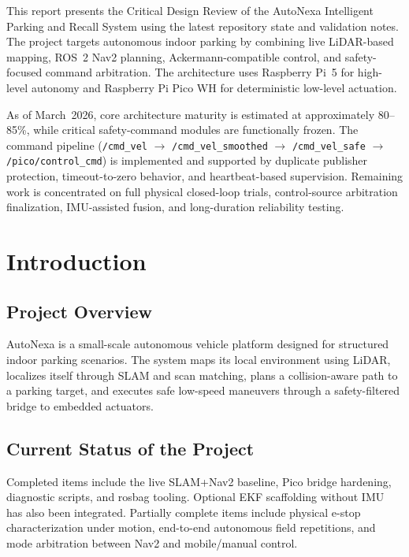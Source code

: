 \documentclass[12pt,a4paper]{report}
\newcommand{\projectname}{AutoNexa}
\begin{document}
This report presents the Critical Design Review of the \projectname{} Intelligent Parking and Recall System using the latest repository state and validation notes. The project targets autonomous indoor parking by combining live LiDAR-based mapping, ROS~2 Nav2 planning, Ackermann-compatible control, and safety-focused command arbitration. The architecture uses Raspberry Pi~5 for high-level autonomy and Raspberry Pi Pico WH for deterministic low-level actuation.

As of March~2026, core architecture maturity is estimated at approximately 80--85\%, while critical safety-command modules are functionally frozen. The command pipeline (\texttt{/cmd\_vel} $\rightarrow$ \texttt{/cmd\_vel\_smoothed} $\rightarrow$ \texttt{/cmd\_vel\_safe} $\rightarrow$ \texttt{/pico/control\_cmd}) is implemented and supported by duplicate publisher protection, timeout-to-zero behavior, and heartbeat-based supervision. Remaining work is concentrated on full physical closed-loop trials, control-source arbitration finalization, IMU-assisted fusion, and long-duration reliability testing.

\chapter{Introduction}

\section{Project Overview}
\projectname{} is a small-scale autonomous vehicle platform designed for structured indoor parking scenarios. The system maps its local environment using LiDAR, localizes itself through SLAM and scan matching, plans a collision-aware path to a parking target, and executes safe low-speed maneuvers through a safety-filtered bridge to embedded actuators.

\section{Current Status of the Project}
Completed items include the live SLAM+Nav2 baseline, Pico bridge hardening, diagnostic scripts, and rosbag tooling. Optional EKF scaffolding without IMU has also been integrated. Partially complete items include physical e-stop characterization under motion, end-to-end autonomous field repetitions, and mode arbitration between Nav2 and mobile/manual control.
\end{document}
